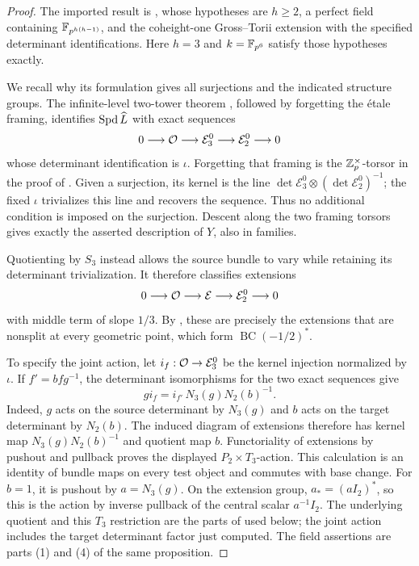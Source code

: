 \begin{proof}
The imported result is \cite[Proposition 2.7.1(1)--(5)]{BMR2026}, whose
hypotheses are $h\ge2$, a perfect field containing
$\mathbb F_{p^{h(h-1)}}$, and the coheight-one Gross--Torii extension with the
specified determinant identifications.  Here $h=3$ and
$k=\mathbb F_{p^6}$ satisfy those hypotheses exactly.

We recall why its formulation gives all surjections and the indicated
structure groups.  The infinite-level two-tower theorem
\cite[Theorem 2.6.3]{BMR2026}, followed by forgetting the étale framing,
identifies $\operatorname{Spd}\widehat L$ with exact sequences
\[
 0\longrightarrow\mathcal O\longrightarrow\mathcal E_3^0
   \longrightarrow\mathcal E_2^0\longrightarrow0
\]
whose determinant identification is $\iota$.  Forgetting that framing is
the $\mathbb Z_p^{\times}$-torsor in the proof of
\cite[Proposition 2.7.1(2)]{BMR2026}.  Given a surjection, its kernel is
the line
$\det\mathcal E_3^0\otimes(\det\mathcal E_2^0)^{-1}$; the fixed
$\iota$ trivializes this line and recovers the sequence.  Thus no
additional condition is imposed on the surjection.  Descent along the
two framing torsors gives exactly the asserted description of $Y$, also
in families.

Quotienting by $S_3$ instead allows the source bundle to vary while
retaining its determinant trivialization.  It therefore classifies
extensions
\[
 0\longrightarrow\mathcal O\longrightarrow\mathcal E
   \longrightarrow\mathcal E_2^0\longrightarrow0
\]
with middle term of slope $1/3$.  By
\cite[Proposition 2.7.1(5)]{BMR2026}, these are precisely the extensions
that are nonsplit at every geometric point, which form
$\operatorname{BC}(-1/2)^*$.

To specify the joint action, let $i_f:\mathcal O\to\mathcal E_3^0$ be the
kernel injection normalized by $\iota$.  If $f'=bfg^{-1}$, the
determinant isomorphisms for the two exact sequences give
\[
 g i_f=i_{f'}\,N_3(g)N_2(b)^{-1}.
\]
Indeed, $g$ acts on the source determinant by $N_3(g)$ and $b$ acts on
the target determinant by $N_2(b)$.  The induced diagram of extensions
therefore has kernel map $N_3(g)N_2(b)^{-1}$ and quotient map $b$.
Functoriality of extensions by pushout and pullback proves the displayed
$P_2\times T_3$-action.  This calculation is an identity of bundle maps
on every test object and commutes with base change.  For $b=1$, it is
pushout by $a=N_3(g)$.  On the extension group, $a_*=(aI_2)^*$,
so this is the action by inverse pullback of the central scalar $a^{-1}I_2$.
The underlying quotient and this $T_3$ restriction
are the parts of \cite[Proposition 2.7.1(5)]{BMR2026} used below; the
joint action includes the target determinant factor just computed.
The field assertions are parts (1) and (4) of the same proposition.
\end{proof}

